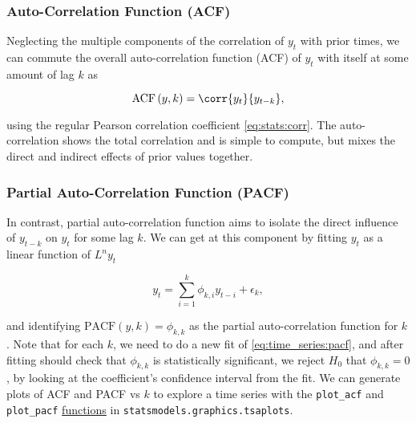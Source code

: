 \subsubsection{Auto-Correlation Function (ACF)}
\label{additional:time_series:acf}

Neglecting the multiple components of the correlation of $y_{t}$ with prior times,
we can commute the overall auto-correlation function (ACF) of $y_{t}$
with itself at some amount of lag $k$ as

\begin{equation}\label{eq:time_series:acf}
\text{ACF}\left(y,k\right) = \corr{y_{t}}{y_{t-k}},
\end{equation}

\noindent using the regular Pearson correlation coefficient \cref{eq:stats:corr}.
The auto-correlation shows the total correlation and is simple to compute,
but mixes the direct and indirect effects of prior values together.

\subsubsection{Partial Auto-Correlation Function (PACF)}
\label{additional:time_series:pacf}

In contrast, partial auto-correlation function
aims to isolate the direct influence of $y_{t-k}$ on $y_{t}$ for some lag $k$.
We can get at this component by fitting $y_{t}$ as a linear function of $L^{n} y_{t}$

\begin{equation}\label{eq:time_series:pacf}
y_{t} = \sum_{i=1}^{k} \phi_{k,i} y_{t-i} + \epsilon_{k},
\end{equation}

\noindent and identifying $\text{PACF}\left(y,k\right) = \phi_{k,k}$
as the partial auto-correlation function for $k$.
Note that for each $k$, we need to do a new fit of \cref{eq:time_series:pacf},
and after fitting should check that $\phi_{k,k}$ is statistically significant,
\ie we reject $H_{0}$ that $\phi_{k,k}=0$, by looking at the coefficient's confidence interval from the fit.
We can generate plots of ACF and PACF vs $k$ to explore a time series
with the \texttt{plot\_acf} and \texttt{plot\_pacf}
\href{https://www.statsmodels.org/stable/graphics.html}{functions} in \texttt{statsmodels.graphics.tsaplots}.


